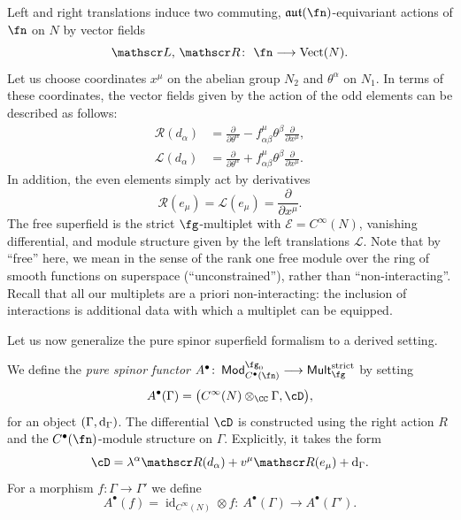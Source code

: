 \documentclass[10pt,a4paper]{amsart}
\numberwithin{equation}{section}
\def\cE{\mathcal E}\def\cF{\mathcal F}\def\cG{\mathcal G}\def\cH{\mathcal H}
\def\cat#1{\ensuremath{\mathsf{#1}}}
\DeclareMathOperator{\Mod}{\cat{Mod}}
\DeclareMathOperator{\Mult}{\cat{Mult}}
\def\lie#1{\ensuremath{\mathfrak{#1}}}
\def\aut{\ensuremath{\lie{aut}}}
\def\d{{\rm d}}
\DeclareMathOperator{\id}{id}
\DeclareMathOperator{\Vect}{Vect}
\def\sL{\mathscr L}
\def\sR{\mathscr R}
\begin{document}
Left and right translations induce two commuting, $\aut(\fn)$-equivariant actions of $\fn$ on $N$ by vector fields
\begin{equation*}
\sL,\, \sR \colon \ \fn \longrightarrow \Vect(N) .
\end{equation*}
Let us choose coordinates $x^\mu$ on the abelian group $N_2$
and $\theta^\alpha$ on $N_1$. In terms of these coordinates, the vector fields given by the action of the odd elements can be described as follows:
\begin{equation*}
\begin{split}
\sR(d_\alpha) &= \frac{\partial}{\partial \theta^\alpha} - f^\mu_{\alpha \beta} \theta^\beta \frac{\partial}{\partial x^\mu}, \\
\sL(d_\alpha) &= \frac{\partial}{\partial \theta^\alpha} + f^\mu_{\alpha \beta} \theta^\beta \frac{\partial}{\partial x^\mu}.
\end{split}
\end{equation*}
In addition, the even elements simply act by derivatives
\begin{equation*}
\sR(e_\mu) = \sL(e_\mu) = \frac{\partial}{\partial x^\mu}.
\end{equation*}
The free superfield is the strict $\fg$-multiplet with $\cE = C^\infty(N)$, vanishing differential, and module structure given by the left translations $\sL$. Note that by ``free'' here, we mean in the sense of the rank one free module over the ring of smooth functions on superspace (``unconstrained''), rather than ``non-interacting''. Recall that all our multiplets are a priori non-interacting: the inclusion of interactions is additional data with which a multiplet can be equipped.


Let us now generalize the pure spinor superfield formalism to a derived setting.
\begin{dfn}
	We define the \emph{pure spinor functor} $A^\bullet \colon \Mod_{C^\bullet(\fn)}^{\fg_0} \longrightarrow \Mult_{\fg}^{\mathrm{strict}}$ by setting
	\begin{equation*}
	A^\bullet(\Gamma) = \big(C^\infty(N) \otimes_\CC \Gamma , \cD\big) ,
	\end{equation*}
	for an object $(\Gamma , \d_\Gamma)$.
	The differential $\cD$ is constructed using the right action $R$ and the $C^\bullet(\fn)$-module structure on $\Gamma$. Explicitly, it takes the form
	\begin{equation*}
	\cD = \lambda^\alpha \sR(d_\alpha) + v^\mu \sR(e_\mu) + \d_\Gamma .
	\end{equation*}
	For a morphism $f\colon\Gamma \longrightarrow \Gamma'$ we define
	\begin{equation*}
	A^\bullet(f) = \id_{C^\infty(N)} \otimes f \colon \ A^\bullet(\Gamma) \longrightarrow A^\bullet(\Gamma') .
	\end{equation*}
\end{dfn}
\end{document}
